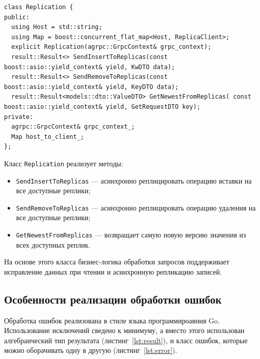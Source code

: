 \documentclass[14pt, russian]{scrartcl}
\newcommand{\refAlgo}[1]{(листинг~\ref{#1})}
\begin{document}
\begin{listing}[H]
  \caption{Объявление класса Replication.}
  \label{lst:operation}
  \begin{verbatim}
class Replication {
public:
  using Host = std::string;
  using Map = boost::concurrent_flat_map<Host, ReplicaClient>;
  explicit Replication(agrpc::GrpcContext& grpc_context);
  result::Result<> SendInsertToReplicas(const boost::asio::yield_context& yield, KwDTO data);
  result::Result<> SendRemoveToReplicas(const boost::asio::yield_context& yield, KeyDTO data);
  result::Result<models::dto::ValueDTO> GetNewestFromReplicas( const boost::asio::yield_context& yield, GetRequestDTO key);
private:
  agrpc::GrpcContext& grpc_context_;
  Map host_to_client_;
};
  \end{verbatim}
\end{listing}

Класс \verb|Replication| реализует методы:

\begin{itemize}
  \item \verb|SendInsertToReplicas| --- асинхронно реплицировать операцию
        вставки на все доступные реплики;
  \item \verb|SendRemoveToReplicas| --- асинхронно реплицировать операцию
        удаления на все доступные реплики;
  \item \verb|GetNewestFromReplicas| --- возвращает самую новую версию значения
        из всех доступных реплик.
\end{itemize}

На основе этого класса бизнес-логика обработки запросов поддерживает исправление
данных при чтении и асинхронную репликацию записей.

\subsection{Особенности реализации обработки ошибок}

Обработка ошибок реализована в стиле языка программироавния Go. Использование
исключений сведено к минимуму, а вместо этого использован алгебраический тип
результата \refAlgo{lst:result}, и класс ошибок, которые можно оборачивать одну
в другую \refAlgo{lst:error}.
\end{document}
